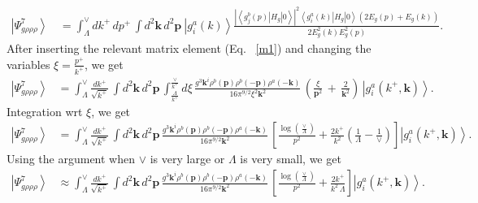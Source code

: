 \documentclass[aps,prd,amsmath,amssymb,nofootinbib]{revtex4-2}
\numberwithin{equation}{section}
\begin{document}
\begin{figure}[h]
    \label{fig:3}
\end{figure}
\begin{align}\label{degen}
\left|\Psi_{g\rho\rho\rho}^{7}\right\rangle \, & = \int_{\Lambda}^{\vee}dk^{+}\, dp^{+}\,\int d^{2}\mathbf{k}\, d^{2}\mathbf{p}\:\left|g_{i}^{a}(k)\right\rangle \frac{\left|\left\langle g_{j}^{b}(p)\left|H_{g}\right|0\right\rangle \right|^{2}\left\langle g_{i}^{a}(k)\left|H_{g}\right|0\right\rangle (2E_{g}(p)+E_{g}(k))}{2E_{g}^{2}(k)E_{g}^{2}(p)}.
\end{align}
After inserting the relevant matrix element (Eq.~ \eqref{m1}) and changing the variables $\xi = \frac{p^{+}}{k^{+}}$, we get
\begin{align} \label{virtual}
  \left|\Psi_{g\rho\rho\rho}^{7}\right\rangle & =\int_{\Lambda}^{\vee}\frac{dk^{+}}{\sqrt{k^{+}}}\,\int d^{2}\mathbf{k}\, d^{2}\mathbf{p}\,\int_{\frac{\Lambda}{k^{+}}}^{\frac{\vee}{k^{+}}}d\xi\,\frac{g^{3}\mathbf{k}^{i}\rho^{b}(\mathbf{p})\rho^{b}(-\mathbf{p})\rho^{a}(-\mathbf{k})}{16\pi^{9/2}\xi^{2}\mathbf{k}^{2}}\,\left(\frac{\xi}{\mathbf{p}^{2}}\,+\,\frac{2}{\mathbf{k}^{2}}\right)\,\left|g_{i}^{a}(k^{+},\mathbf{k})\right\rangle.
\end{align}
Integration wrt $\xi$, we get
\begin{align} \label{zetainteg}
  \left|\Psi_{g\rho\rho\rho}^{7}\right\rangle & =\int_{\Lambda}^{\vee}\frac{dk^{+}}{\sqrt{k^{+}}}\,\int d^{2}\mathbf{k}\, d^{2}\mathbf{p}\,\frac{g^{3}\mathbf{k}^{i}\rho^{b}(\mathbf{p})\rho^{b}(-\mathbf{p})\rho^{a}(-\mathbf{k})}{16\pi^{9/2}\mathbf{k}^{2}}\,\left[\frac{\log{\left(\frac{\vee}{\Lambda}\right)}}{p^{2}}+\frac{2k^{+}}{k^{2}}\left(\frac{1}{\Lambda} - \frac{1}{\vee}\right)\right]\left|g_{i}^{a}(k^{+},\mathbf{k})\right\rangle. 
\end{align}
Using the argument when $\vee$ is very large or $\Lambda$ is very small, we get
\begin{align}
     \left|\Psi_{g\rho\rho\rho}^{7}\right\rangle & \approx \int_{\Lambda}^{\vee}\frac{dk^{+}}{\sqrt{k^{+}}}\,\int d^{2}\mathbf{k}\, d^{2}\mathbf{p}\,\frac{g^{3}\mathbf{k}^{i}\rho^{b}(\mathbf{p})\rho^{b}(-\mathbf{p})\rho^{a}(-\mathbf{k})}{16\pi^{9/2}\mathbf{k}^{2}}\,\left[\frac{\log{\left(\frac{\vee}{\Lambda}\right)}}{p^{2}}+\frac{2k^{+}}{k^{2}\,\Lambda}\right]\left|g_{i}^{a}(k^{+},\mathbf{k})\right\rangle. 
\end{align}
\end{document}
